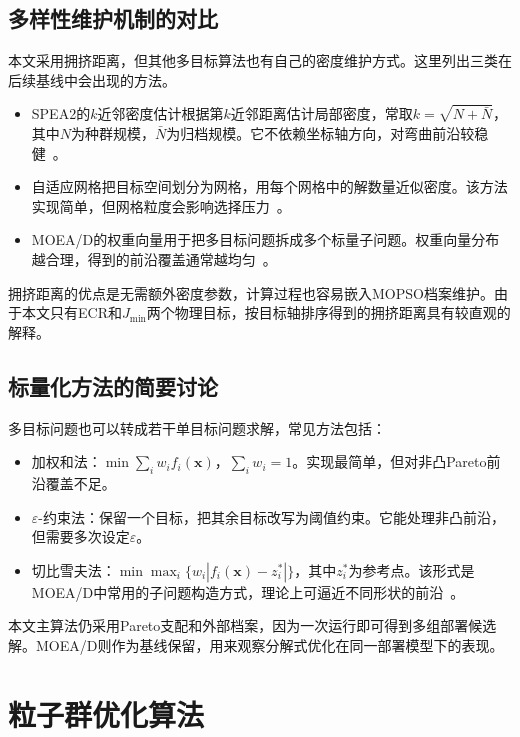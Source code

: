 \subsection{多样性维护机制的对比}

本文采用拥挤距离，但其他多目标算法也有自己的密度维护方式。这里列出三类在后续基线中会出现的方法。

\begin{itemize}
    \item SPEA2的$k$近邻密度估计根据第$k$近邻距离估计局部密度，常取$k=\sqrt{N+\bar{N}}$，其中$N$为种群规模，$\bar{N}$为归档规模。它不依赖坐标轴方向，对弯曲前沿较稳健~\cite{Zitzler2001}。
    \item 自适应网格把目标空间划分为网格，用每个网格中的解数量近似密度。该方法实现简单，但网格粒度会影响选择压力~\cite{Knowles2000}。
    \item MOEA/D的权重向量用于把多目标问题拆成多个标量子问题。权重向量分布越合理，得到的前沿覆盖通常越均匀~\cite{Zhang2007}。
\end{itemize}

拥挤距离的优点是无需额外密度参数，计算过程也容易嵌入MOPSO档案维护。由于本文只有ECR和$J_{\min}$两个物理目标，按目标轴排序得到的拥挤距离具有较直观的解释。

\subsection{标量化方法的简要讨论}

多目标问题也可以转成若干单目标问题求解，常见方法包括：

\begin{itemize}
    \item 加权和法：$\min \sum_i w_i f_i(\mathbf{x})$，$\sum_i w_i = 1$。实现最简单，但对非凸Pareto前沿覆盖不足。
    \item $\varepsilon$-约束法：保留一个目标，把其余目标改写为阈值约束。它能处理非凸前沿，但需要多次设定$\varepsilon$。
    \item 切比雪夫法：$\min \max_i \{w_i |f_i(\mathbf{x}) - z_i^*|\}$，其中$z_i^*$为参考点。该形式是MOEA/D中常用的子问题构造方式，理论上可逼近不同形状的前沿~\cite{Zhang2007}。
\end{itemize}

本文主算法仍采用Pareto支配和外部档案，因为一次运行即可得到多组部署候选解。MOEA/D则作为基线保留，用来观察分解式优化在同一部署模型下的表现。

\section{粒子群优化算法}

